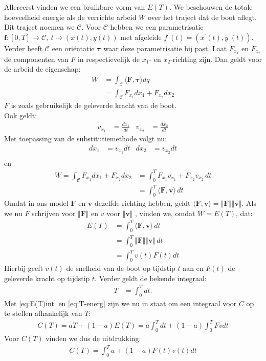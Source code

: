 Allereerst vinden we een bruikbare vorm van \(E(T)\). 
We beschouwen de totale hoeveelheid energie als de verrichte arbeid \(W\) over het traject dat de boot aflegt. Dit traject noemen we \(\mathcal{C}\). 
Voor \( \mathcal{C} \) hebben we een parametrisatie \( \mathbf{f}: [0, T] \rightarrow \mathcal{C},~t \mapsto (x(t), y(t)) \) met afgeleide $ f^\prime(t) = (x^\prime(t), y^\prime(t)) $. 
Verder heeft $ \mathcal{C} $ een ori\"entatie $ \mathbf{\tau} $ waar deze parametrisatie bij past. Laat $ F_{x_1} $ en $ F_{x_2} $ de componenten van $ F $ in respectievelijk de $ x_1 $- en $ x_2 $-richting zijn. 
Dan geldt voor de arbeid de eigenschap:
\begin{align*}
		W &= \int_\mathcal{C} \langle \mathbf{F}, \mathbf{\tau} \rangle dq \\
		&= \int_\mathcal{C} F_{x_1} dx_1 + F_{x_2} dx_2
\end{align*}
\(F\) is zoals gebruikelijk de geleverde kracht van de boot.\\
Ook geldt:
\begin{align*}
		v_{x_1} &= \frac{dx_1}{dt} & v_{x_2} &= \frac{dx_2}{dt}
\end{align*}
Met toepassing van de substitutiemethode volgt nu:
\begin{align*}
	dx_1 &= v_{x_1}dt & dx_2 &= v_{x_2}dt\\
\end{align*}
en
\begin{align*}
	W = \int_\mathcal{C} F_{x_1} dx_1 + F_{x_2} dx_2 &= \int_0^T F_{x_1} v_{x_1} + F_{x_2} v_{x_2} \, dt\\
	&= \int_0^T \langle \mathbf{F}, \mathbf{v} \rangle \, dt
\end{align*}
Omdat in ons model \( \mathbf{F} \) en $ \mathbf{v} $ dezelfde richting hebben, geldt $ \langle \mathbf{F}, \mathbf{v} \rangle = \Vert \mathbf{F} \Vert \Vert \mathbf{v} \Vert $. Als we nu $ F $ schrijven voor $ \Vert \mathbf{F} \Vert $ en $ v $ voor $ \Vert \mathbf{v} \Vert $ , vinden we, omdat \(W=E(T)\), dat:
\begin{align}
	E(T) &= \int_0^T \langle \mathbf{F}, \mathbf{v} \rangle \, dt\\
	&= \int_0^T \Vert \mathbf{F} \Vert \Vert \mathbf{v} \Vert \, dt\\
	&= \int_{0}^{T} v(t)F(t) dt\label{eq:E(T)int}
\end{align}
Hierbij geeft \(v(t)\) de snelheid van de boot op tijdstip \(t\) aan en \(F(t)\) de geleverde kracht op tijdstip \(t\). Verder geldt de bekende integraal:
\begin{align}
	T &= \int_{0}^{T} dt.\label{eq:T-energ}
\end{align}
Met \eqref{eq:E(T)int} en \eqref{eq:T-energ} zijn we nu in staat om een integraal voor \(C\) op te stellen afhankelijk van \(T\):
\begin{align*}
	C(T) = a T + (1 - a) E(T) = a \int_{0}^{T} dt + (1-a)\int_0^T F v dt 
\end{align*}
Voor \(C(T)\) vinden we dus de uitdrukking:
\begin{align}
	C(T)=\int_0^T a + (1-a)F(t)v(t) dt\label{eq:Cint}
\end{align}

